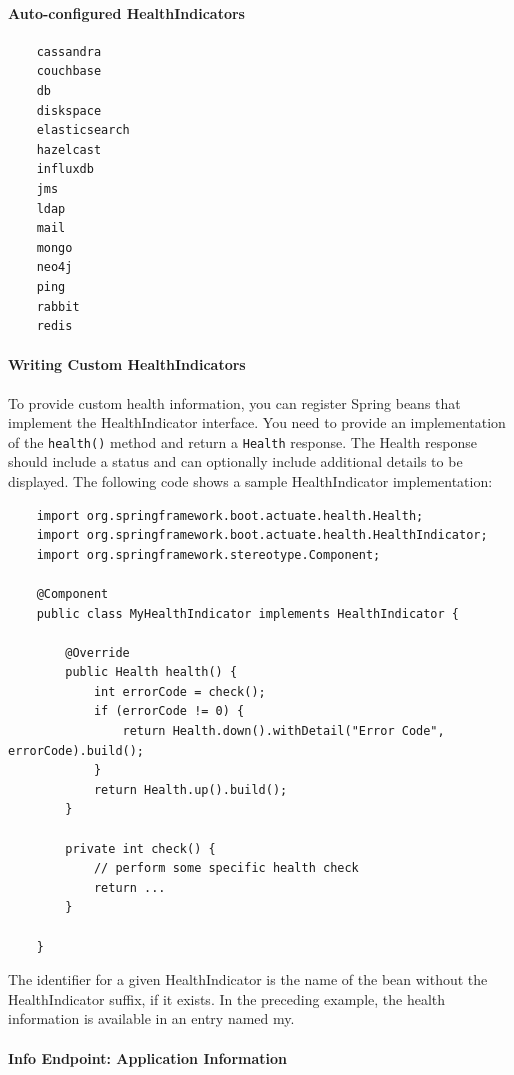 \documentclass{scrartcl}
\begin{document}
\paragraph{Auto-configured HealthIndicators}

\begin{lstlisting}
    cassandra
    couchbase
    db
    diskspace
    elasticsearch
    hazelcast
    influxdb
    jms
    ldap
    mail
    mongo
    neo4j
    ping
    rabbit
    redis
\end{lstlisting}

\paragraph{Writing Custom HealthIndicators}

To provide custom health information, you can register Spring beans that implement the HealthIndicator interface. You need to provide an implementation of the \lstinline|health()| method and return a \lstinline|Health| response. The Health response should include a status and can optionally include additional details to be displayed. The following code shows a sample HealthIndicator implementation:

    \begin{lstlisting}
    import org.springframework.boot.actuate.health.Health;
    import org.springframework.boot.actuate.health.HealthIndicator;
    import org.springframework.stereotype.Component;

    @Component
    public class MyHealthIndicator implements HealthIndicator {

        @Override
        public Health health() {
            int errorCode = check();
            if (errorCode != 0) {
                return Health.down().withDetail("Error Code", errorCode).build();
            }
            return Health.up().build();
        }

        private int check() {
            // perform some specific health check
            return ...
        }

    }
    \end{lstlisting}

The identifier for a given HealthIndicator is the name of the bean without the HealthIndicator suffix, if it exists. In the preceding example, the health information is available in an entry named my.

\paragraph{Info Endpoint: Application Information}
\end{document}
